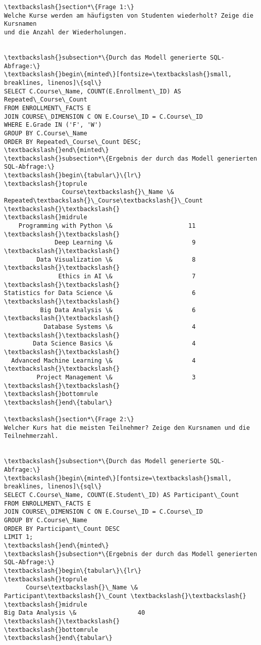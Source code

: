\documentclass[11pt]{article}
\begin{document}
    \begin{Verbatim}[commandchars=\\\{\}]
\textbackslash{}section*\{Frage 1:\}
Welche Kurse werden am häufigsten von Studenten wiederholt? Zeige die Kursnamen
und die Anzahl der Wiederholungen.


\textbackslash{}subsection*\{Durch das Modell generierte SQL-Abfrage:\}
\textbackslash{}begin\{minted\}[fontsize=\textbackslash{}small, breaklines, linenos]\{sql\}
SELECT C.Course\_Name, COUNT(E.Enrollment\_ID) AS Repeated\_Course\_Count
FROM ENROLLMENT\_FACTS E
JOIN COURSE\_DIMENSION C ON E.Course\_ID = C.Course\_ID
WHERE E.Grade IN ('F', 'W')
GROUP BY C.Course\_Name
ORDER BY Repeated\_Course\_Count DESC;
\textbackslash{}end\{minted\}
\textbackslash{}subsection*\{Ergebnis der durch das Modell generierten SQL-Abfrage:\}
\textbackslash{}begin\{tabular\}\{lr\}
\textbackslash{}toprule
                Course\textbackslash{}\_Name \&  Repeated\textbackslash{}\_Course\textbackslash{}\_Count \textbackslash{}\textbackslash{}
\textbackslash{}midrule
    Programming with Python \&                     11 \textbackslash{}\textbackslash{}
              Deep Learning \&                      9 \textbackslash{}\textbackslash{}
         Data Visualization \&                      8 \textbackslash{}\textbackslash{}
               Ethics in AI \&                      7 \textbackslash{}\textbackslash{}
Statistics for Data Science \&                      6 \textbackslash{}\textbackslash{}
          Big Data Analysis \&                      6 \textbackslash{}\textbackslash{}
           Database Systems \&                      4 \textbackslash{}\textbackslash{}
        Data Science Basics \&                      4 \textbackslash{}\textbackslash{}
  Advanced Machine Learning \&                      4 \textbackslash{}\textbackslash{}
         Project Management \&                      3 \textbackslash{}\textbackslash{}
\textbackslash{}bottomrule
\textbackslash{}end\{tabular\}

\textbackslash{}section*\{Frage 2:\}
Welcher Kurs hat die meisten Teilnehmer? Zeige den Kursnamen und die
Teilnehmerzahl.


\textbackslash{}subsection*\{Durch das Modell generierte SQL-Abfrage:\}
\textbackslash{}begin\{minted\}[fontsize=\textbackslash{}small, breaklines, linenos]\{sql\}
SELECT C.Course\_Name, COUNT(E.Student\_ID) AS Participant\_Count
FROM ENROLLMENT\_FACTS E
JOIN COURSE\_DIMENSION C ON E.Course\_ID = C.Course\_ID
GROUP BY C.Course\_Name
ORDER BY Participant\_Count DESC
LIMIT 1;
\textbackslash{}end\{minted\}
\textbackslash{}subsection*\{Ergebnis der durch das Modell generierten SQL-Abfrage:\}
\textbackslash{}begin\{tabular\}\{lr\}
\textbackslash{}toprule
      Course\textbackslash{}\_Name \&  Participant\textbackslash{}\_Count \textbackslash{}\textbackslash{}
\textbackslash{}midrule
Big Data Analysis \&                 40 \textbackslash{}\textbackslash{}
\textbackslash{}bottomrule
\textbackslash{}end\{tabular\}


\end{Verbatim}
\end{document}
